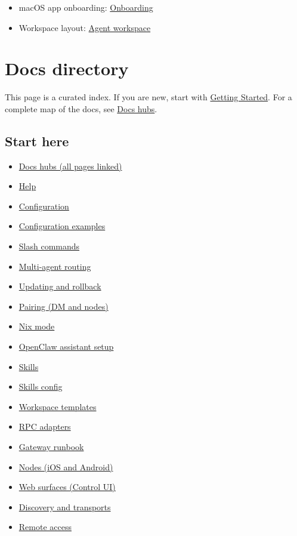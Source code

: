 \begin{itemize}
  \item macOS app onboarding: \href{/start/onboarding}{Onboarding}
  \item Workspace layout: \href{/concepts/agent-workspace}{Agent workspace}
\end{itemize}



\clearpage

\section{Docs directory}

This page is a curated index. If you are new, start with \href{/start/getting-started}{Getting Started}.
For a complete map of the docs, see \href{/start/hubs}{Docs hubs}.

\subsection{Start here}


\begin{itemize}
  \item \href{/start/hubs}{Docs hubs (all pages linked)}
  \item \href{/help}{Help}
  \item \href{/gateway/configuration}{Configuration}
  \item \href{/gateway/configuration-examples}{Configuration examples}
  \item \href{/tools/slash-commands}{Slash commands}
  \item \href{/concepts/multi-agent}{Multi-agent routing}
  \item \href{/install/updating}{Updating and rollback}
  \item \href{/channels/pairing}{Pairing (DM and nodes)}
  \item \href{/install/nix}{Nix mode}
  \item \href{/start/openclaw}{OpenClaw assistant setup}
  \item \href{/tools/skills}{Skills}
  \item \href{/tools/skills-config}{Skills config}
  \item \href{/reference/templates/AGENTS}{Workspace templates}
  \item \href{/reference/rpc}{RPC adapters}
  \item \href{/gateway}{Gateway runbook}
  \item \href{/nodes}{Nodes (iOS and Android)}
  \item \href{/web}{Web surfaces (Control UI)}
  \item \href{/gateway/discovery}{Discovery and transports}
  \item \href{/gateway/remote}{Remote access}
\end{itemize}


